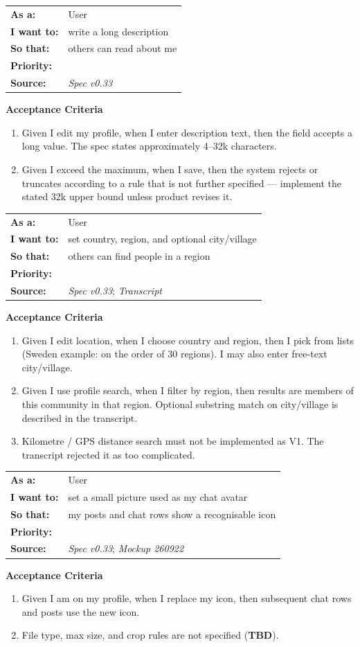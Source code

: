\documentclass[11pt,a4paper]{article}
\makeatletter
\newcommand{\priPzero}{\colorbox{p0}{\makebox[4.6em]{\textcolor{white}{\scriptsize\bfseries P0 V1}}}}
\newcommand{\srcSpec}{\textit{Spec v0.33}}
\newcommand{\srcTx}{\textit{Transcript}}
\newcommand{\srcMock}{\textit{Mockup 260922}}
\newenvironment{story}[1]{%
  \Needspace{10\baselineskip}%
  \vspace{0.7em}%
  \noindent
  \colorbox{navy}{\makebox[\dimexpr\textwidth-2\fboxsep\relax][l]{\textcolor{white}{\bfseries\ #1}}}%
  \par\vspace{0.35em}%
}{\par\vspace{0.55em}}
\newcommand{\storymeta}[5]{%
  \noindent
  \begin{tabularx}{\textwidth}{@{}>{\bfseries}l X@{}}
    As a: & #1 \\
    I want to: & #2 \\
    So that: & #3 \\
    Priority: & #4 \\
    Source: & #5 \\
  \end{tabularx}
  \par\vspace{0.3em}
}
\newcommand{\achead}{\noindent\textbf{Acceptance Criteria}\par}
\makeatother
\begin{document}
\begin{story}{PROF-005 --- Long description}
\storymeta{User}{write a long description}{others can read about me}{\priPzero}{\srcSpec}
\achead
\begin{enumerate}
  \item Given I edit my profile, when I enter description text, then the field accepts a long value. The spec states approximately 4--32k characters.
  \item Given I exceed the maximum, when I save, then the system rejects or truncates according to a rule that is not further specified --- implement the stated 32k upper bound unless product revises it.
\end{enumerate}
\end{story}

\begin{story}{PROF-006 --- Location without kilometre distance}
\storymeta{User}{set country, region, and optional city/village}{others can find people in a region}{\priPzero}{\srcSpec; \srcTx}
\achead
\begin{enumerate}
  \item Given I edit location, when I choose country and region, then I pick from lists (Sweden example: on the order of 30 regions). I may also enter free-text city/village.
  \item Given I use profile search, when I filter by region, then results are members of this community in that region. Optional substring match on city/village is described in the transcript.
  \item Kilometre / GPS distance search must not be implemented as V1. The transcript rejected it as too complicated.
\end{enumerate}
\end{story}

\begin{story}{PROF-007 --- Small chat-icon picture}
\storymeta{User}{set a small picture used as my chat avatar}{my posts and chat rows show a recognisable icon}{\priPzero}{\srcSpec; \srcMock}
\achead
\begin{enumerate}
  \item Given I am on my profile, when I replace my icon, then subsequent chat rows and posts use the new icon.
  \item File type, max size, and crop rules are not specified (\textbf{TBD}).
\end{enumerate}
\end{story}
\end{document}
